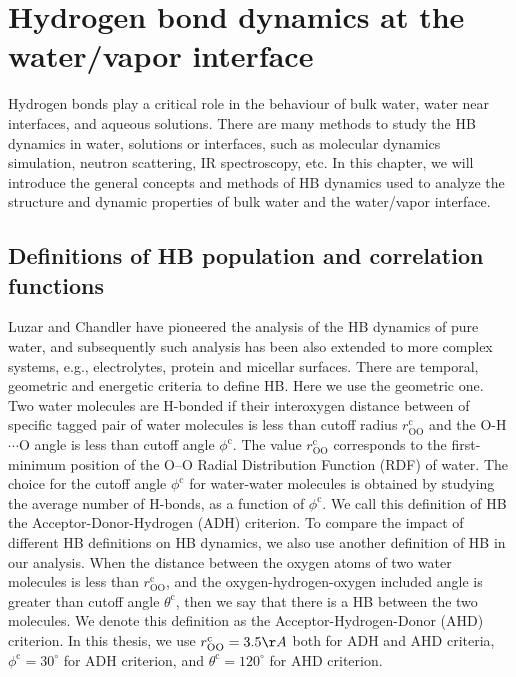 \chapter{Hydrogen bond dynamics at the water/vapor interface}\label{CHAPTER_HB}
Hydrogen bonds play a critical role in the behaviour of bulk water,\cite{Eisenberg1969,Luzar1996,Cabane2005} 
water near interfaces,\cite{Chowdhary2008} and aqueous solutions. \cite{Naslund2005} 
There are many methods to study the HB dynamics in water, solutions or interfaces, 
such as molecular dynamics simulation,\cite{Tongraar2006,Chanda2006,Tongraar2010,Chowdhary2008,Banerjee2016} neutron scattering, 
IR spectroscopy,\cite{Werhahn2011,Fournier2016} etc.
In this chapter, we will introduce the general concepts and methods of HB dynamics \cite{AL96,Luzar1996,DC87} used to analyze the structure 
and dynamic properties of bulk water and the water/vapor interface. 

\section{Definitions of HB population and correlation functions}\label{para:def_HBP}
Luzar and Chandler \cite{AL96} have pioneered the analysis of the HB dynamics of pure water, and
subsequently such analysis has been also extended to more complex systems, e.g., electrolytes, \cite{Chandra2000} protein and  micellar surfaces. \cite{SP05}
There are temporal, geometric\cite{Kumar2007} and energetic criteria \cite{Sciortino1989}to define HB.
Here we use the geometric one.
Two water molecules are H-bonded if their interoxygen distance between of specific tagged pair of water molecules 
is less than cutoff radius $r^{\text{c}}_{\text{OO}}$ and
the O-H$\cdots$O angle is less than cutoff angle $\phi^{\text{c}}$. \cite{AKS86,JT90,SB02} 
The value $r^{\text{c}}_{\text{OO}}$ corresponds to the first-minimum position of the O--O Radial Distribution Function (RDF) of water. \cite{Sciortino1989}   
The choice for the cutoff angle $\phi^{\text{c}}$ for water-water molecules is obtained by studying the average number of H-bonds,
as a function of $\phi^{\text{c}}$. \cite{Luzar1993} We call this definition of HB the Acceptor-Donor-Hydrogen (ADH) criterion. 
To compare the impact of different HB definitions on HB dynamics, we also use another definition of HB in our analysis. 
When the distance between the oxygen atoms of two water molecules is less than $r^{\text{c}}_{\text{OO}}$, 
and the oxygen-hydrogen-oxygen included angle is greater than cutoff angle $\theta^{\text{c}}$, then we say that there is a HB between the two molecules. 
We denote this definition as the Acceptor-Hydrogen-Donor (AHD) criterion.
In this thesis, we use $r^{\text{c}}_{\text{OO}}=3.5\AA$ both for ADH and AHD criteria, $\phi^{\text{c}}=30^{\circ}$ for ADH criterion, 
and $\theta^{\text{c}}=120^{\circ}$ for AHD criterion.


